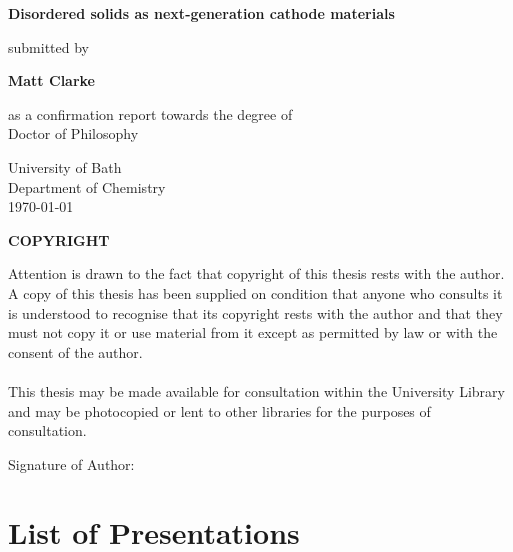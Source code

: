\documentclass[12pt, oneside]{report}
\begin{document}
	
\setcounter{tocdepth}{1} 

\begin{titlepage}
\begin{center}
\vspace*{1cm}
 
\LARGE
\textbf{Disordered solids as next-generation cathode materials}
       
\vspace{0.5cm}
\normalsize       
submitted by
       
      
\Large
\textbf{Matt Clarke}
 
\vspace{0.5cm}
\normalsize
as a confirmation report towards the degree of\\
Doctor of Philosophy
 
\vspace{0.5cm}
       
\LARGE
University of Bath\\
\normalsize
Department of Chemistry\\
       
\vspace{0.8cm}
\today
       
\vfill
\large
\textbf{COPYRIGHT}
\end{center}
Attention is drawn to the fact that copyright of this thesis rests with the author. A
copy of this thesis has been supplied on condition that anyone who consults it is
understood to recognise that its copyright rests with the author and that they must
not copy it or use material from it except as permitted by law or with the consent of
the author.
\\
\\
This thesis may be made available for consultation within the University Library and may be photocopied or lent to other libraries for the purposes of consultation.

\vspace{2cm}
\noindent Signature of Author: \dotfill
   
\end{titlepage}


\tableofcontents
\newpage
\chapter*{List of Presentations}
\newpage

\listoffigures

\newpage
{}





\renewcommand{\bibname}{References}


\newpage


\end{document}
